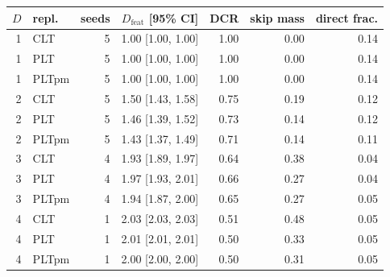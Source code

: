 \begin{tabular}{rlrrrrr}\toprule
$D$ & repl. & seeds & $D_\mathrm{feat}$ [95\% CI] & DCR & skip mass & direct frac.\\\midrule
1 & CLT & 5 & 1.00 [1.00, 1.00] & 1.00 & 0.00 & 0.14\\
1 & PLT & 5 & 1.00 [1.00, 1.00] & 1.00 & 0.00 & 0.14\\
1 & PLTpm & 5 & 1.00 [1.00, 1.00] & 1.00 & 0.00 & 0.14\\
2 & CLT & 5 & 1.50 [1.43, 1.58] & 0.75 & 0.19 & 0.12\\
2 & PLT & 5 & 1.46 [1.39, 1.52] & 0.73 & 0.14 & 0.12\\
2 & PLTpm & 5 & 1.43 [1.37, 1.49] & 0.71 & 0.14 & 0.11\\
3 & CLT & 4 & 1.93 [1.89, 1.97] & 0.64 & 0.38 & 0.04\\
3 & PLT & 4 & 1.97 [1.93, 2.01] & 0.66 & 0.27 & 0.04\\
3 & PLTpm & 4 & 1.94 [1.87, 2.00] & 0.65 & 0.27 & 0.05\\
4 & CLT & 1 & 2.03 [2.03, 2.03] & 0.51 & 0.48 & 0.05\\
4 & PLT & 1 & 2.01 [2.01, 2.01] & 0.50 & 0.33 & 0.05\\
4 & PLTpm & 1 & 2.00 [2.00, 2.00] & 0.50 & 0.31 & 0.05\\
\bottomrule\end{tabular}
